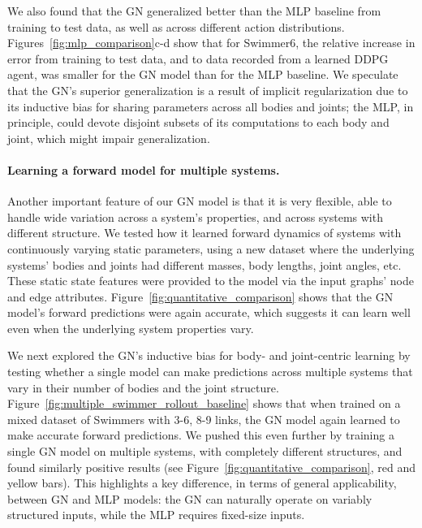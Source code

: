 \documentclass{article}
\begin{document}
We also found that the GN generalized better than the MLP baseline from training to test data, as well as across different action distributions. 
%
Figures~\ref{fig:mlp_comparison}c-d show that for Swimmer6, the relative increase in error from training to test data, and to data recorded from a learned DDPG agent, was smaller for the GN model than for the MLP baseline.
%
We speculate that the GN's superior generalization is a result of implicit regularization due to its inductive bias for sharing parameters across all bodies and joints; the MLP, in principle, could devote disjoint subsets of its computations to each body and joint, which might impair generalization.



\paragraph{Learning a forward model for multiple systems.}
Another important feature of our GN model is that it is very flexible, able to handle wide variation across a system's properties, and across systems with different structure.
%
We tested how it learned forward dynamics of systems with continuously varying static parameters, using a new dataset where the underlying systems' bodies and joints had different masses, body lengths, joint angles, etc. These static state features were provided to the model via the input graphs' node and edge attributes.
%
Figure~\ref{fig:quantitative_comparison} shows that the GN model's forward predictions were again accurate, which suggests it can learn well even when the underlying system properties vary.

We next explored the GN's inductive bias for body- and joint-centric learning by testing whether a single model can make predictions across multiple systems that vary in their number of bodies and the joint structure. Figure~\ref{fig:multiple_swimmer_rollout_baseline} shows that when trained on a mixed dataset of Swimmers with 3-6, 8-9 links, the GN model again learned to make accurate forward predictions.  
We pushed this even further by training a single GN model on multiple systems, with completely different structures, and found similarly positive results (see Figure~\ref{fig:quantitative_comparison}, red and yellow bars). 
%
This highlights a key difference, in terms of general applicability, between GN and MLP models: the GN can naturally operate on variably structured inputs, while the MLP requires fixed-size inputs.
\end{document}
